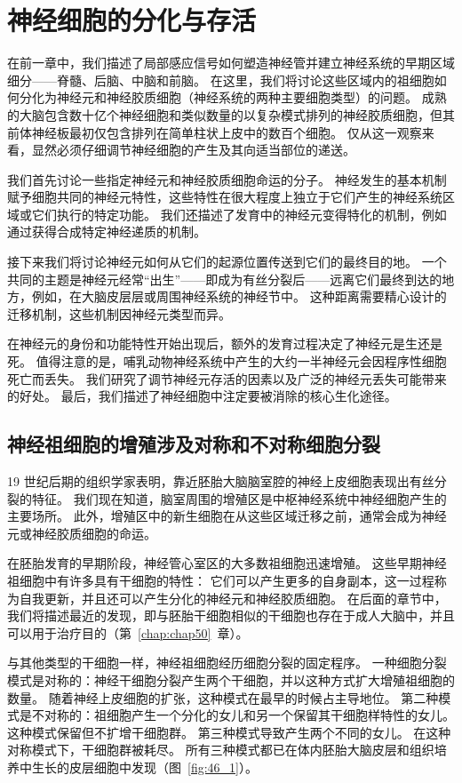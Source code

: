 \chapter{神经细胞的分化与存活} \label{chap:chap46}


在前一章中，我们描述了局部感应信号如何塑造神经管并建立神经系统的早期区域细分——脊髓、后脑、中脑和前脑。
在这里，我们将讨论这些区域内的祖细胞如何分化为神经元和神经胶质细胞（神经系统的两种主要细胞类型）的问题。
成熟的大脑包含数十亿个神经细胞和类似数量的以复杂模式排列的神经胶质细胞，但其前体神经板最初仅包含排列在简单柱状上皮中的数百个细胞。
仅从这一观察来看，显然必须仔细调节神经细胞的产生及其向适当部位的递送。


我们首先讨论一些指定神经元和神经胶质细胞命运的分子。
神经发生的基本机制赋予细胞共同的神经元特性，这些特性在很大程度上独立于它们产生的神经系统区域或它们执行的特定功能。
我们还描述了发育中的神经元变得特化的机制，例如通过获得合成特定神经递质的机制。


接下来我们将讨论神经元如何从它们的起源位置传送到它们的最终目的地。
一个共同的主题是神经元经常“出生”——即成为有丝分裂后——远离它们最终到达的地方，例如，在大脑皮层层或周围神经系统的神经节中。
这种距离需要精心设计的迁移机制，这些机制因神经元类型而异。


在神经元的身份和功能特性开始出现后，额外的发育过程决定了神经元是生还是死。
值得注意的是，哺乳动物神经系统中产生的大约一半神经元会因程序性细胞死亡而丢失。
我们研究了调节神经元存活的因素以及广泛的神经元丢失可能带来的好处。
最后，我们描述了神经细胞中注定要被消除的核心生化途径。



\section{神经祖细胞的增殖涉及对称和不对称细胞分裂}

19 世纪后期的组织学家表明，靠近胚胎大脑脑室腔的神经上皮细胞表现出有丝分裂的特征。
我们现在知道，脑室周围的增殖区是中枢神经系统中神经细胞产生的主要场所。
此外，增殖区中的新生细胞在从这些区域迁移之前，通常会成为神经元或神经胶质细胞的命运。


在胚胎发育的早期阶段，神经管心室区的大多数祖细胞迅速增殖。
这些早期神经祖细胞中有许多具有干细胞的特性：
它们可以产生更多的自身副本，这一过程称为自我更新，并且还可以产生分化的神经元和神经胶质细胞。
在后面的章节中，我们将描述最近的发现，即与胚胎干细胞相似的干细胞也存在于成人大脑中，并且可以用于治疗目的（第~\ref{chap:chap50}~章）。


与其他类型的干细胞一样，神经祖细胞经历细胞分裂的固定程序。
一种细胞分裂模式是对称的：神经干细胞分裂产生两个干细胞，并以这种方式扩大增殖祖细胞的数量。
随着神经上皮细胞的扩张，这种模式在最早的时候占主导地位。
第二种模式是不对称的：祖细胞产生一个分化的女儿和另一个保留其干细胞样特性的女儿。
这种模式保留但不扩增干细胞群。
第三种模式导致产生两个不同的女儿。
在这种对称模式下，干细胞群被耗尽。
所有三种模式都已在体内胚胎大脑皮层和组织培养中生长的皮层细胞中发现（图~\ref{fig:46_1}）。


